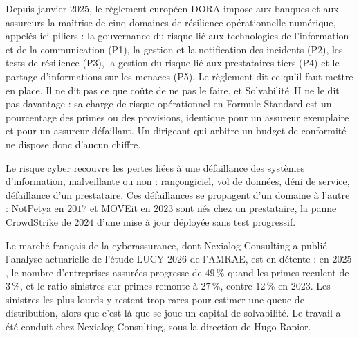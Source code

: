 
Depuis janvier 2025, le règlement européen DORA impose aux banques et aux assureurs la maîtrise de
cinq domaines de résilience opérationnelle numérique, appelés ici piliers : la gouvernance du
risque lié aux technologies de l'information et de la communication (P1), la gestion et la
notification des incidents (P2), les tests de résilience (P3), la gestion du risque lié aux
prestataires tiers (P4) et le partage d'informations sur les menaces (P5). Le règlement dit ce
qu'il faut mettre en place. Il ne dit pas ce que coûte de ne pas le faire, et Solvabilité~II ne le
dit pas davantage : sa charge de risque opérationnel en Formule Standard est un pourcentage des
primes ou des provisions, identique pour un assureur exemplaire et pour un assureur défaillant.
Un dirigeant qui arbitre un budget de conformité ne dispose donc d'aucun chiffre.

Le risque cyber recouvre les pertes liées à une défaillance des systèmes d'information,
malveillante ou non : rançongiciel, vol de données, déni de service, défaillance d'un prestataire.
Ces défaillances se propagent d'un domaine à l'autre : NotPetya en $2017$ et MOVEit en $2023$
sont nés chez un prestataire, la panne CrowdStrike de $2024$ d'une mise à jour déployée sans test
progressif.

Le marché français de la cyberassurance, dont Nexialog Consulting a publié l'analyse actuarielle
de l'étude LUCY $2026$ de l'AMRAE, est en détente : en $2025$, le nombre d'entreprises assurées
progresse de $49\,\%$ quand les primes reculent de $3\,\%$, et le ratio sinistres sur primes
remonte à $27\,\%$, contre $12\,\%$ en $2023$. Les sinistres les plus lourds y restent trop rares
pour estimer une queue de distribution, alors que c'est là que se joue un capital de solvabilité.
Le travail a été conduit chez Nexialog Consulting, sous la direction de Hugo Rapior.

